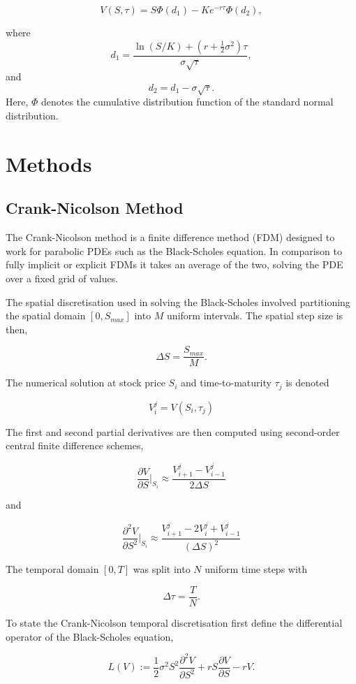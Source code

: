 \documentclass[11pt,a4paper]{article}
\begin{document}
\begin{equation}\label{eq:3}
V(S,\tau) = S\Phi(d_1) - K e^{-r\tau}\Phi(d_2),
\end{equation}

where
\[
d_1 = \frac{\ln(S/K) + \left(r + \frac{1}{2}\sigma^2\right)\tau}
{\sigma\sqrt{\tau}},
\]
and
\[
d_2 = d_1 - \sigma\sqrt{\tau}.
\]
Here, $\Phi$ denotes the cumulative distribution function of the standard normal distribution.

\section{Methods}

\subsection{Crank-Nicolson Method}

The Crank-Nicolson method is a finite difference method (FDM) designed to work for parabolic PDEs such as the Black-Scholes equation. In comparison to fully implicit or explicit FDMs it takes an average of the two, solving the PDE over a fixed grid of values.

The spatial discretisation used in solving the Black-Scholes involved partitioning the spatial domain $[0,S_{max}]$ into $M$ uniform intervals. The spatial step size is then, 

$$\Delta S = \frac{S_{max}}{M}.$$

The numerical solution at stock price $S_i$ and time-to-maturity $\tau_j$ is denoted 

$$V_i^j = V(S_i, \tau_j)$$

The first and second partial derivatives are then computed using second-order central finite difference schemes,

$$\frac{\partial V}{\partial S}\biggr |_{S_i} \approx \frac{V_{i+1}^j-V^j_{i-1}}{2 \Delta S}$$

and

$$ \frac{\partial^2 V}{\partial S^2} \biggr |_{S_i} \approx \frac{V_{i+1}^j-2V_i^j +V^j_{i-1}}{(\Delta S)^2}$$

The temporal domain $[0,T]$ was split into $N$ uniform time steps with

$$\Delta \tau = \frac{T}{N}.$$

To state the Crank-Nicolson temporal discretisation first define the differential operator of the Black-Scholes equation,

\begin{equation}\label{eq:4}
    L(V) := \frac{1}{2} \sigma^2 S^2 \frac{\partial^2 V}{\partial S^2}+rS\frac{\partial V}{\partial S}-rV.
\end{equation}
\end{document}
